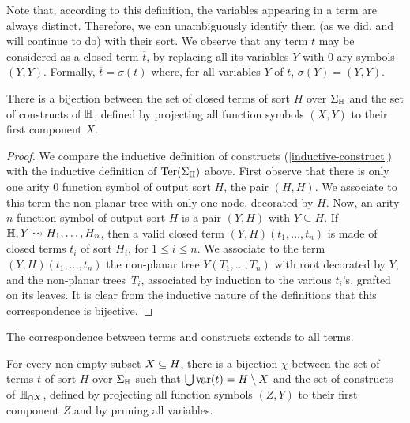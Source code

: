\begin{rem} \label{open-to-closed}
  Note that, according to this definition, the variables appearing in a term are always distinct. 
  Therefore, we can unambiguously identify them (as we did, and will continue to do) with their  sort.
We 
observe that any term $t$ may be considered as a closed term $\overline{t}$, by replacing all its variables $Y$ with $0$-ary symbols $(Y,Y)$. Formally, $\overline{t}=\sigma(t)$ where, for all variables $Y$ of $t$, $\sigma(Y)=(Y,Y)$.
\end{rem}

\begin{lemma} 
  \label{l:bijection-terms}
  There is a bijection between the set of closed terms of sort $H$ over $\Sigma_{\mathbb H}$ and the set of constructs of ${\mathbb H}$, defined by projecting all function symbols $(X,Y)$ to their first component $X$.
\end{lemma}

\begin{proof}
  We compare the inductive definition of constructs (\cref{inductive-construct}) with the inductive definition of $\operatorname{Ter}(\Sigma_{\mathbb H})$ above.
  First observe that there is only one arity $0$ function symbol of output sort $H$, the pair $(H,H)$. 
  We associate to this term the non-planar tree with only one node, decorated by $H$.
  Now, an arity $n$ function symbol of output sort $H$ is a pair $(Y,H)$ with $Y \subseteq H$. 
  If ${\mathbb H},Y \leadsto H_1,\ldots,H_n$, then a valid closed term $(Y,H)(t_1,\ldots,t_n)$ is made of closed terms $t_i$ of  sort $H_i$, for $1 \leq i \leq n$. 
  We associate to the term $(Y,H)(t_1,\ldots,t_n)$ the non-planar tree $Y(T_1,\ldots,T_n)$ with root decorated by $Y$, and the non-planar trees~$T_i$, associated by induction to the various $t_i$'s, grafted on its leaves.
  It is clear from the inductive nature of the definitions that this correspondence is bijective.
\end{proof}

The correspondence between terms and constructs extends to all terms.

\begin{lemma} 
  \label{l:bijection-open}
  For every non-empty subset $X\subseteq H$,
 there is a bijection $\chi$ between the set of  terms $t$ of  sort $H$ over $\Sigma_{\mathbb H}$  such that $\bigcup \operatorname{var}(t)=H\setminus X$ and the set of constructs of ${\mathbb H}_{\cap X}$, 
 defined by projecting all function symbols $(Z,Y)$ to their first component $Z$ and by pruning all variables.
\end{lemma}

